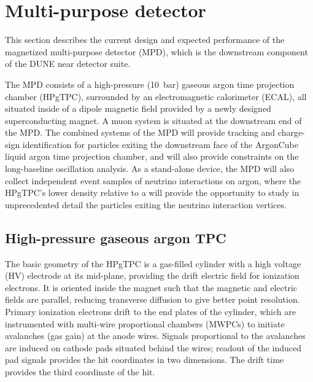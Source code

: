 	


\section{Multi-purpose detector}
\label{sec:exsum-nd-mpt}
%

This section describes the current design and expected performance of the magnetized multi-purpose detector (MPD), which is the downstream component of the DUNE near detector suite.

The MPD consists of a high-pressure (10~bar) gaseous argon time projection chamber (HPgTPC), surrounded by an electromagnetic calorimeter (ECAL), all situated inside of a dipole magnetic field provided by a newly designed superconducting magnet. A muon system is situated at the downstream end of the MPD. The combined systems of the MPD will provide tracking and charge-sign identification for particles exiting the downstream face of the ArgonCube liquid argon time projection chamber, and will also provide constraints on the long-baseline oscillation analysis. As a stand-alone device, the MPD will also collect independent event samples of neutrino interactions on argon, where the HPgTPC's lower density relative to a  will provide the opportunity to study in unprecedented detail the particles exiting the neutrino interaction vertices.


\subsection{High-pressure gaseous argon TPC}
The basic geometry of the HPgTPC is a gas-filled cylinder with a high voltage (HV) electrode at its mid-plane, providing the drift electric field for ionization electrons. It is oriented inside the magnet such that the magnetic and electric fields are parallel, reducing transverse diffusion to give better point resolution. Primary ionization electrons drift to the end plates of the cylinder, which are instrumented with multi-wire proportional chambers (MWPCs) to initiate avalanches (gas gain) at the anode wires.  Signals proportional to the avalanches are induced on cathode pads situated behind the wires; readout of the induced pad signals provides the hit coordinates in two dimensions.  The drift time provides the third coordinate of the hit.

